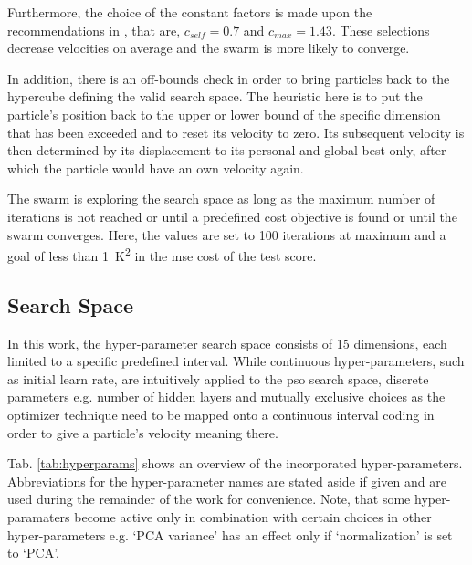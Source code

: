 Furthermore, the choice of the constant factors is made upon the recommendations in \cite{Clerc2006}, that are, $c_{self}= 0.7$ and $c_{max}= 1.43$.
These selections decrease velocities on average and the swarm is more likely to converge.

In addition, there is an off-bounds check in order to bring particles back to the hypercube defining the valid search space.
The heuristic here is to put the particle's position back to the upper or lower bound of the specific dimension that has been exceeded and to reset its velocity to zero.
Its subsequent velocity is then determined by its displacement to its personal and global best only, after which the particle would have an own velocity again.

The swarm is exploring the search space as long as the maximum number of iterations is not reached or until a predefined cost objective is found or until the swarm converges.
Here, the values are set to 100 iterations at maximum and a goal of less than \SI{1}{\kelvin\squared} in the \gls{mse} cost of the test score.

\subsection{Search Space}
In this work, the hyper-parameter search space consists of 15 dimensions, each limited to a specific predefined interval.
While continuous hyper-parameters, such as initial learn rate, are intuitively applied to the \gls{pso} search space, discrete parameters e.g. number of hidden layers and mutually exclusive choices as the optimizer technique need to be mapped onto a continuous interval coding in order to give a particle's velocity meaning there.

Tab. \ref{tab:hyperparams} shows an overview of the incorporated hyper-parameters.
Abbreviations for the hyper-parameter names are stated aside if given and are used during the remainder of the work for convenience.
Note, that some hyper-paramaters become active only in combination with certain choices in other hyper-parameters e.g. `PCA variance' has an effect only if `normalization' is set to `PCA'.

